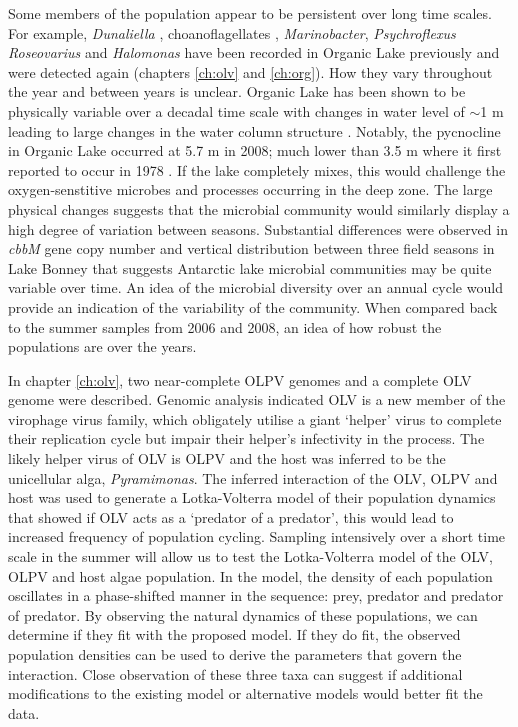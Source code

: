 Some members of the population appear to be persistent over long time scales.
For example, \emph{Dunaliella} \cite{Franzmann1987b}, choanoflagellates \cite{vandenHoff1986}, \emph{Marinobacter}, \emph{Psychroflexus} \emph{Roseovarius} and \emph{Halomonas} \cite{Bowman2000b} have been recorded in Organic Lake previously and were detected again (chapters \ref{ch:olv} and \ref{ch:org}).
How they vary throughout the year and between years is unclear.
Organic Lake has been shown to be physically variable over a decadal time scale with changes in water level of $\sim$1 m leading to large changes in the water column structure \cite{Gibson1995, Gibson1996}.
Notably, the pycnocline in Organic Lake occurred at 5.7 m in 2008; much lower than 3.5 m where it first reported to occur in 1978 \cite{Franzmann1987b}.
If the lake completely mixes, this would challenge the oxygen-senstitive microbes and processes occurring in the deep zone.
The large physical changes suggests that the microbial community would similarly display a high degree of variation between seasons.
Substantial differences were observed in \emph{cbbM} gene copy number and vertical distribution between three field seasons in Lake Bonney \cite{Kong2012b} that suggests Antarctic lake microbial communities may be quite variable over time.
An idea of the microbial diversity over an annual cycle would provide an indication of the variability of the community.
When compared back to the summer samples from 2006 and 2008, an idea of how robust the populations are over the years.

In chapter \ref{ch:olv}, two near-complete \ac{OLPV} genomes and a complete \ac{OLV} genome were described.
Genomic analysis indicated \ac{OLV} is a new member of the virophage virus family, which obligately utilise a  giant `helper' virus to complete their replication cycle but impair their helper's infectivity in the process.
The likely helper virus of \ac{OLV} is \ac{OLPV} and the host was inferred to be the unicellular alga, \emph{Pyramimonas}.
The inferred interaction of the \ac{OLV}, \ac{OLPV} and host was used to generate a Lotka-Volterra model of their population dynamics that showed if \ac{OLV} acts as a `predator of a predator', this would lead to increased frequency of population cycling.
Sampling intensively over a short time scale in the summer will allow us to test the Lotka-Volterra model of the \ac{OLV}, \ac{OLPV} and host algae population.
In the model, the density of each population oscillates in a phase-shifted manner in the sequence: prey, predator and predator of predator.
By observing the natural dynamics of these populations, we can determine if they fit with the proposed model.
If they do fit, the observed population densities can be used to derive the parameters that govern the interaction.
Close observation of these three taxa can suggest if additional modifications to the existing model or alternative models would better fit the data.

